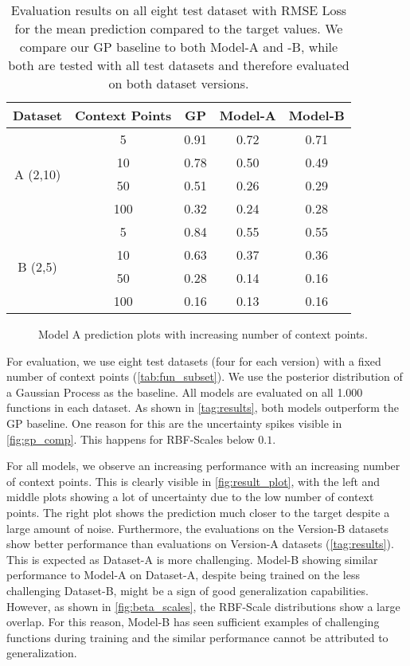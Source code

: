\begin{table}[]
	\caption{Evaluation results on all eight test dataset with RMSE Loss for the mean prediction compared to the target values. We compare our GP baseline to both Model-A and -B, while both are tested with all test datasets and therefore evaluated on both dataset versions. }
	\begin{tabular}{c c c c c}
		\toprule
		Dataset & Context Points & GP & Model-A & Model-B\\
		\midrule
		\multirow{4}{*}{A (2,10)} & 5 & 0.91 & 0.72 & 0.71\\
		&10& 0.78 & 0.50 & 0.49\\ 
		&50 & 0.51 & 0.26 & 0.29\\
		&100 & 0.32 & 0.24 & 0.28\\\midrule
		\multirow{4}{*}{B (2,5)} & 5 & 0.84 & 0.55 & 0.55\\
		& 10 & 0.63 & 0.37 & 0.36\\
		& 50 & 0.28 & 0.14 & 0.16\\
		& 100 & 0.16 & 0.13 & 0.16\\\bottomrule
	\end{tabular}
	\label{tag:results}
\end{table}

\begin{figure*}[t]
	\centering
	\resizebox{0.9\textwidth}{!}{
		
		
		
	}
	\caption{Model A prediction plots with increasing number of context points.}
	\label{fig:result_plot}
\end{figure*}

For evaluation, we use eight test datasets (four for each version) with a fixed number of context points (\autoref{tab:fun_subset}). We use the posterior distribution of a Gaussian Process as the baseline. All models are evaluated on all 1.000 functions in each dataset.
As shown in \autoref{tag:results}, both models outperform the GP baseline. One reason for this are the uncertainty spikes visible in \autoref{fig:gp_comp}. This happens for RBF-Scales below $0.1$.

For all models, we observe an increasing performance with an increasing number of context points. This is clearly visible in \autoref{fig:result_plot}, with the left and middle plots showing a lot of uncertainty due to the low number of context points. The right plot shows the prediction much closer to the target despite a large amount of noise. Furthermore, the evaluations on the Version-B datasets show better performance than evaluations on Version-A datasets (\autoref{tag:results}). This is expected as Dataset-A is more challenging. Model-B showing similar performance to Model-A on Dataset-A, despite being trained on the less challenging Dataset-B, might be a sign of good generalization capabilities. However, as shown in \autoref{fig:beta_scales}, the RBF-Scale distributions show a large overlap. For this reason, Model-B has seen sufficient examples of challenging functions during training and the similar performance cannot be attributed to generalization.

